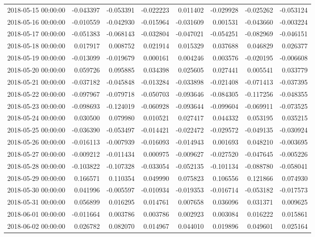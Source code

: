 \begin{tabular}{lrrrrrrr}
2018-05-15 00:00:00 & -0.043397 & -0.053391 & -0.022223 & 0.011402 & -0.029928 & -0.025262 & -0.053124 \\
2018-05-16 00:00:00 & -0.010559 & -0.042930 & -0.015964 & -0.031609 & 0.001531 & -0.043660 & -0.003224 \\
2018-05-17 00:00:00 & -0.051383 & -0.068143 & -0.032804 & -0.047021 & -0.054251 & -0.082969 & -0.046151 \\
2018-05-18 00:00:00 & 0.017917 & 0.008752 & 0.021914 & 0.015329 & 0.037688 & 0.046829 & 0.026377 \\
2018-05-19 00:00:00 & -0.013099 & -0.019679 & 0.000161 & 0.004246 & 0.003576 & -0.020195 & -0.006608 \\
2018-05-20 00:00:00 & 0.059726 & 0.095885 & 0.034398 & 0.025605 & 0.027441 & 0.005541 & 0.033779 \\
2018-05-21 00:00:00 & -0.037182 & -0.045848 & -0.013284 & -0.033898 & -0.021408 & -0.071413 & -0.037395 \\
2018-05-22 00:00:00 & -0.097967 & -0.079718 & -0.050703 & -0.093646 & -0.084305 & -0.117256 & -0.048355 \\
2018-05-23 00:00:00 & -0.098693 & -0.124019 & -0.060928 & -0.093644 & -0.099604 & -0.069911 & -0.073525 \\
2018-05-24 00:00:00 & 0.030500 & 0.079980 & 0.010521 & 0.027417 & 0.044332 & 0.053195 & 0.035215 \\
2018-05-25 00:00:00 & -0.036390 & -0.053497 & -0.014421 & -0.022472 & -0.029572 & -0.049135 & -0.030924 \\
2018-05-26 00:00:00 & -0.016113 & -0.007939 & -0.016093 & -0.014943 & 0.001693 & 0.048210 & -0.003695 \\
2018-05-27 00:00:00 & -0.009212 & -0.011434 & 0.000975 & -0.009627 & -0.027520 & -0.047645 & -0.005226 \\
2018-05-28 00:00:00 & -0.103822 & -0.107328 & -0.033054 & -0.052135 & -0.101134 & -0.088780 & -0.058041 \\
2018-05-29 00:00:00 & 0.166571 & 0.110354 & 0.049990 & 0.075823 & 0.106556 & 0.121866 & 0.074930 \\
2018-05-30 00:00:00 & 0.041996 & -0.005597 & -0.010934 & -0.019353 & -0.016714 & -0.053182 & -0.017573 \\
2018-05-31 00:00:00 & 0.056899 & 0.016295 & 0.014761 & 0.007658 & 0.036096 & 0.031371 & 0.009625 \\
2018-06-01 00:00:00 & -0.011664 & 0.003786 & 0.003786 & 0.002923 & 0.003084 & 0.016222 & 0.015861 \\
2018-06-02 00:00:00 & 0.026782 & 0.082070 & 0.014967 & 0.044010 & 0.019896 & 0.049601 & 0.025164 \\

\end{tabular}
